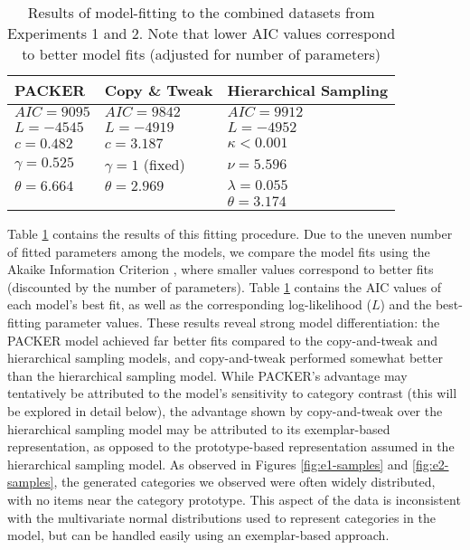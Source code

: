 \documentclass[12pt]{article}
\begin{document}
\begin{flushleft}
\begin{table}
\centering
\caption{Results of model-fitting to the combined datasets from Experiments 1 and 2. Note that lower AIC values correspond to better model fits (adjusted for number of parameters)}
\label{table:global-model-fits}
\begin{tabular}{ l l l}
\\
 \textbf{PACKER}    & \textbf{Copy \& Tweak} & \textbf{Hierarchical Sampling} \\ 
 \hline
 $AIC = 9095$       & $AIC = 9842$          & $AIC = 9912$     \\ 
 $L = -4545$        & $L = -4919$           & $L = -4952$       \\ 
 $c = 0.482$        & $c = 3.187$           & $\kappa < 0.001$  \\
 $\gamma = 0.525$   & $\gamma = 1$ (fixed)  & $\nu = 5.596$     \\ 
 $\theta = 6.664$   & $\theta = 2.969$      & $\lambda = 0.055$    \\ 
                    &                       & $\theta = 3.174$  \\ 
\end{tabular}
\end{table}


Table \ref{table:global-model-fits} contains the results of this fitting procedure. Due to the uneven number of fitted parameters among the models, we compare the model fits using the Akaike Information Criterion \citep[AIC;][]{akaike1974new}, where smaller values correspond to better fits (discounted by the number of parameters). Table \ref{table:global-model-fits} contains the AIC values of each model's best fit, as well as the corresponding log-likelihood ($L$) and the best-fitting parameter values. These results reveal strong model differentiation: the PACKER model achieved far better fits compared to the copy-and-tweak and hierarchical sampling models, and copy-and-tweak performed somewhat better than the hierarchical sampling model. While PACKER's advantage may tentatively be attributed to the model's sensitivity to category contrast (this will be explored in detail below), the advantage shown by copy-and-tweak over the hierarchical sampling model may be attributed to its exemplar-based representation, as opposed to the prototype-based representation assumed in the hierarchical sampling model. As observed in Figures \ref{fig:e1-samples} and \ref{fig:e2-samples}, the generated categories we observed were often widely distributed, with no items near the category prototype. This aspect of the data is inconsistent with the multivariate normal distributions used to represent categories in the \cite{jern2013probabilistic} model, but can be handled easily using an exemplar-based approach. 


\end{flushleft}
\end{document}
